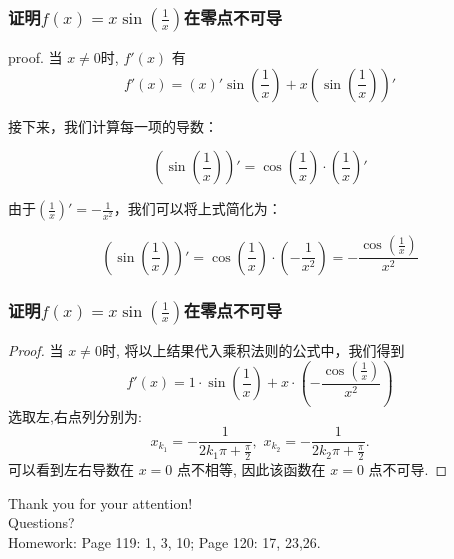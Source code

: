 \documentclass[
10pt,
aspectratio=43,
]{beamer}
\begin{document}
\begin{frame}
	\frametitle{证明$f(x)=x\sin\left(\frac{1}{x}\right)$在零点不可导}
			
	\begin{block}{proof.}
		当 $x\neq0$时, $f'(x)$ 有
		\[
			f'(x) = \left(x\right)' \sin\left(\frac{1}{x}\right) + x \left(\sin\left(\frac{1}{x}\right)\right)'
		\]
		
		接下来，我们计算每一项的导数：
		
		\[
			\left(\sin\left(\frac{1}{x}\right)\right)' = \cos\left(\frac{1}{x}\right) \cdot \left(\frac{1}{x}\right)'
		\]
		
		由于$\left(\frac{1}{x}\right)' = -\frac{1}{x^2}$，我们可以将上式简化为：
		
		\[
			\left(\sin\left(\frac{1}{x}\right)\right)' = \cos\left(\frac{1}{x}\right) \cdot \left(-\frac{1}{x^2}\right) = -\frac{\cos\left(\frac{1}{x}\right)}{x^2}
		\]
		
	\end{block}
		
\end{frame}
	
\begin{frame}
	\frametitle{证明$f(x)=x\sin\left(\frac{1}{x}\right)$在零点不可导}
				
	\begin{proof}
		当 $x\neq0$时, 将以上结果代入乘积法则的公式中，我们得到
		\[
			f'(x) = 1 \cdot \sin\left(\frac{1}{x}\right) + x \cdot \left(-\frac{\cos\left(\frac{1}{x}\right)}{x^2}\right)
		\]
		选取左,右点列分别为:
		\[
			x_{k_1}=-\displaystyle\frac{1}{2k_1\pi+\frac{\pi}{2}},\,\,x_{k_2}=-\displaystyle\frac{1}{2k_2\pi+\frac{\pi}{2}}.
		\]
		可以看到左右导数在 $x=0$ 点不相等, 因此该函数在 $x=0$ 点不可导.
	\end{proof}
			
\end{frame}
	


\begin{frame}[plain]
	\vfill
	\centering
	{
		\centering \Huge \color{white} Thank you for your attention!\\[10pt]Questions?\\\bigskip
		Homework: Page 119: 1, 3, 10; Page 120: 17, 23,26.
	}
	\vfill
\end{frame}
\end{document}
